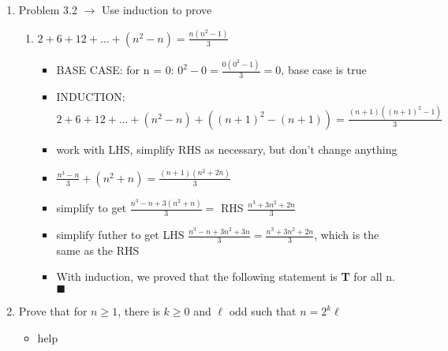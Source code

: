 \documentclass[11pt]{article}
\begin{document}
\begin{enumerate}
\begin{enumerate}
\begin{itemize}
            \end{itemize}
        \end{enumerate}
        \item Problem 3.2 $\rightarrow$ Use induction to prove
        \begin{enumerate}
            \item $2 + 6 + 12 + ... + (n^2 - n) = \frac{n(n^2-1)}{3}$
            \begin{itemize}
                \item BASE CASE: for n = 0: $0^2 - 0 = \frac{0(0^2-1)}{3} = 0$, base case is true
                \item INDUCTION: $2 +6 + 12 + ... + (n^2 - n) + ((n+1)^2-(n+1)) = \frac{(n+1)((n+1)^2-1)}{3}$
                \item work with LHS, simplify RHS as necessary, but don't change anything
                \item $\frac{n^3 - n}{3} + (n^2 + n) = \frac{(n+1)(n^2 + 2n)}{3}$
                \item simplify to get $\frac{n^3 -n + 3(n^2+n)}{3} = $ RHS $\frac{n^3 + 3n^2 + 2n}{3}$
                \item simplify futher to get LHS $\frac{n^3 - n + 3n^2 + 3n}{3} = \frac{n^3 + 3n^2 + 2n}{3}$, which is the same as the RHS
                \item With induction, we proved that the following statement is \textbf{T} for all n. $\blacksquare$
            \end{itemize}
        \end{enumerate}
        \item Prove that for $n \geq 1$, there is $k \geq 0$ and $\ell$ odd such that $n = 2^k\ell$
        \begin{itemize}
            \item help
        \end{itemize}
    \end{enumerate}
\end{document}
